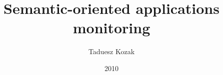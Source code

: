 \documentclass[en]{aghMasters}
\author{Taduesz Kozak}
\title{Semantic-oriented applications monitoring}
\date{2010}
\begin{document}
\titlepages
\tableofcontents
\clearpage









\listoffigures
\listoftables

\end{document}
